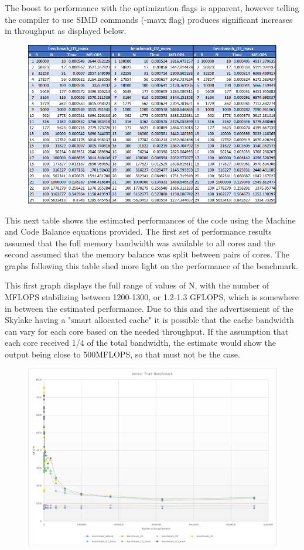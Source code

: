 \documentclass[a4paper, 11pt]{article}
\begin{document}
The boost to performance with the optimization flags is apparent, however telling the compiler to use SIMD commands (-mavx flag) produces significant increases in throughput as displayed below.
\begin{figure}[H]
	\centering
	\includegraphics[width=6in]{vt_mavx.png}
\end{figure}

\newpage
This next table shows the estimated performances of the code using the Machine and Code Balance equations provided. The first set of performance results assumed that the full memory bandwidth was available to all cores and the second assumed that the memory balance was split between pairs of cores. The graphs following this table shed more light on the performance of the benchmark.




This first graph displays the full range of values of N, with the number of MFLOPS stabilizing between 1200-1300, or 1.2-1.3 GFLOPS, which is somewhere in between the estimated performance. Due to this and the advertisement of the Skylake having a "smart allocated cache" it is possible that the cache bandwidth can vary for each core based on the needed throughput. If the assumption that each core received 1/4 of the total bandwidth, the estimate would show the output being close to 500MFLOPS, so that must not be the case.

\begin{figure}[H]
	\centering
	\includegraphics[width=6in]{benchmark_full.png}
\end{figure}
\end{document}
